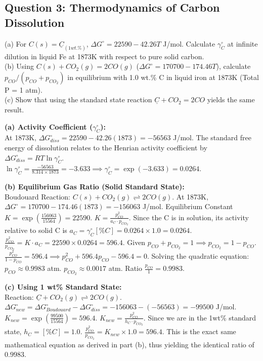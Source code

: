 \documentclass[11pt,a4paper]{article}
\begin{document}
\subsection{Question 3: Thermodynamics of Carbon Dissolution}
\begin{questionbox}
(a) For $C(s) = \underline{C}_{(1 wt.\%)}$, $\Delta G^\circ = 22590 - 42.26T$ J/mol. Calculate $\gamma_C^\circ$ at infinite dilution in liquid Fe at 1873K with respect to pure solid carbon. \\
(b) Using $C(s) + CO_2(g) = 2CO(g)$ ($\Delta G^\circ = 170700 - 174.46T$), calculate $p_{CO}/(p_{CO}+p_{CO_2})$ in equilibrium with 1.0 wt.\% C in liquid iron at 1873K (Total P = 1 atm). \\
(c) Show that using the standard state reaction $\underline{C} + CO_2 = 2CO$ yields the same result.
\end{questionbox}

\begin{solutionbox}
\textbf{(a) Activity Coefficient ($\gamma_C^\circ$):} \\
At 1873K, $\Delta G^\circ_{diss} = 22590 - 42.26(1873) = -56563$ J/mol.
The standard free energy of dissolution relates to the Henrian activity coefficient by $\Delta G^\circ_{diss} = RT \ln \gamma_C^\circ$.
$\ln \gamma_C^\circ = \frac{-56563}{8.314 \times 1873} = -3.633 \implies \gamma_C^\circ = \exp(-3.633) = \mathbf{0.0264}$.

\textbf{(b) Equilibrium Gas Ratio (Solid Standard State):} \\
Boudouard Reaction: $C(s) + CO_2(g) \rightleftharpoons 2CO(g)$.
At 1873K, $\Delta G^\circ = 170700 - 174.46(1873) = -156063$ J/mol.
Equilibrium Constant $K = \exp\left(\frac{156063}{15564}\right) = 22590$.
$K = \frac{p_{CO}^2}{a_C \cdot p_{CO_2}}$. Since the C is in solution, its activity relative to solid C is $a_C = \gamma_C^\circ [\%C] = 0.0264 \times 1.0 = 0.0264$.
$\frac{p_{CO}^2}{p_{CO_2}} = K \cdot a_C = 22590 \times 0.0264 = 596.4$.
Given $p_{CO} + p_{CO_2} = 1 \implies p_{CO_2} = 1 - p_{CO}$.
$\frac{p_{CO}^2}{1 - p_{CO}} = 596.4 \implies p_{CO}^2 + 596.4 p_{CO} - 596.4 = 0$.
Solving the quadratic equation: $p_{CO} \approx 0.9983$ atm. $p_{CO_2} \approx 0.0017$ atm.
Ratio $\frac{p_{CO}}{1} = \mathbf{0.9983}$.

\textbf{(c) Using 1 wt\% Standard State:} \\
Reaction: $\underline{C} + CO_2(g) \rightleftharpoons 2CO(g)$.
$\Delta G^\circ_{new} = \Delta G^\circ_{Boudouard} - \Delta G^\circ_{diss} = -156063 - (-56563) = -99500$ J/mol.
$K_{new} = \exp\left(\frac{99500}{15564}\right) = 596.4$.
$K_{new} = \frac{p_{CO}^2}{h_C \cdot p_{CO_2}}$. Since we are in the 1wt\% standard state, $h_C = [\%C] = 1.0$.
$\frac{p_{CO}^2}{p_{CO_2}} = K_{new} \times 1.0 = 596.4$.
This is the exact same mathematical equation as derived in part (b), thus yielding the identical ratio of $\mathbf{0.9983}$.
\end{solutionbox}
\end{document}
